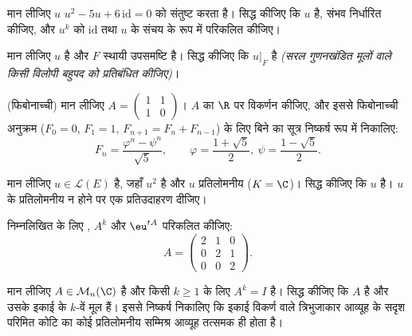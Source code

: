 \begin{exercise}[$\star$]\label{exo:b2:reduction:3}
मान लीजिए $u$ $u^2 - 5u + 6\,\mathrm{id} = 0$ को संतुष्ट करता है। सिद्ध कीजिए कि $u$  है,
संभव  निर्धारित कीजिए, और $u^k$ को $\mathrm{id}$ तथा $u$ के संचय के रूप में
परिकलित कीजिए।
\end{exercise}

\begin{exercise}[$\star\star$]\label{exo:b2:reduction:4}
मान लीजिए $u$  है और $F$ स्थायी उपसमष्टि है। सिद्ध कीजिए कि
$u|_F$  है \emph{(सरल गुणनखंडित मूलों वाले किसी विलोपी बहुपद को
प्रतिबंधित कीजिए)}।
\end{exercise}

\begin{exercise}[$\star\star$]\label{exo:b2:reduction:5}
(फिबोनाच्ची) मान लीजिए $A = \begin{pmatrix} 1 & 1\\ 1 & 0\end{pmatrix}$। $A$ का $\R$ पर विकर्णन कीजिए, और इससे
फिबोनाच्ची अनुक्रम ($F_0 = 0$, $F_1 = 1$, $F_{n+1} = F_n +
F_{n-1}$) के लिए बिने का सूत्र निष्कर्ष रूप
में निकालिए:
\[
F_n = \frac{\varphi^n - \psi^n}{\sqrt 5},
\qquad \varphi = \frac{1 + \sqrt5}{2},\ \psi = \frac{1 -
\sqrt5}{2}.
\]
\end{exercise}

\begin{exercise}[$\star\star$]\label{exo:b2:reduction:6}
मान लीजिए $u \in \mathcal{L}(E)$ है, जहाँ $u^2$  है और $u$ प्रतिलोमनीय ($K = \C$)।
सिद्ध कीजिए कि $u$  है। $u$ के प्रतिलोमनीय न होने पर एक
प्रतिउदाहरण दीजिए।
\end{exercise}

\begin{exercise}[$\star\star$]\label{exo:b2:reduction:7}
निम्नलिखित के लिए , $A^k$ और $\eu^{tA}$ परिकलित कीजिए:
\[
A = \begin{pmatrix} 2 & 1 & 0\\ 0 & 2 & 1\\ 0 & 0 & 2
\end{pmatrix}.
\]
\end{exercise}

\begin{exercise}[$\star\star$]\label{exo:b2:reduction:8}
मान लीजिए $A \in \mathcal{M}_n(\C)$ है और किसी $k \geq 1$ के लिए $A^k = I$ है। सिद्ध कीजिए कि $A$
 है और उसके  इकाई के $k$-वें मूल हैं। इससे
निष्कर्ष निकालिए कि इकाई विकर्ण वाले त्रिभुजाकार आव्यूह के सदृश परिमित
कोटि का कोई प्रतिलोमनीय सम्मिश्र आव्यूह तत्समक ही होता है।
\end{exercise}

